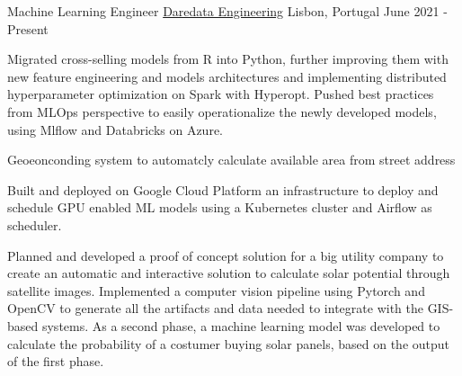 

\begin{cventries}

  \cventry
    {Machine Learning Engineer} %
    {\href{https://daredata.engineering/home}{Daredata Engineering}} %
    {Lisbon, Portugal} %
    {June 2021 - Present} %
    {
      \begin{cvitems} %
        \item {Migrated cross-selling models from R into Python, further improving them with new feature engineering and models architectures and implementing distributed hyperparameter optimization on Spark with Hyperopt. Pushed best practices from MLOps perspective to easily operationalize the newly developed models, using Mlflow and Databricks on Azure.}
        \item {Geoeonconding system to automatcly calculate available area from street address}
        \item {Built and deployed on Google Cloud Platform an infrastructure to deploy and schedule GPU enabled ML models using a Kubernetes cluster and Airflow as scheduler.}
        \item {Planned and developed a proof of concept solution for a big utility company to create an automatic and interactive solution to calculate solar potential through satellite images. Implemented a computer vision pipeline using Pytorch and OpenCV to generate all the artifacts and data needed to integrate with the GIS-based systems. As a second phase, a machine learning model was developed to calculate the probability of a costumer buying solar panels, based on the output of the first
          phase.}
      \end{cvitems}
    }


\end{cventries}

